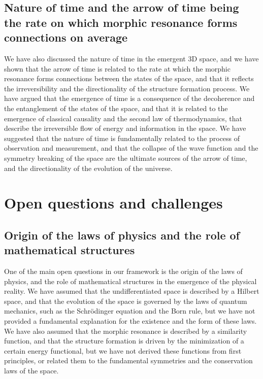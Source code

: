 \subsection{Nature of time and the arrow of time being the rate on which morphic resonance forms connections on average}
We have also discussed the nature of time in the emergent 3D space, and we have shown that the arrow of time is related to the rate at which the morphic resonance forms connections between the states of the space, and that it reflects the irreversibility and the directionality of the structure formation process. We have argued that the emergence of time is a consequence of the decoherence and the entanglement of the states of the space, and that it is related to the emergence of classical causality and the second law of thermodynamics, that describe the irreversible flow of energy and information in the space. We have suggested that the nature of time is fundamentally related to the process of observation and measurement, and that the collapse of the wave function and the symmetry breaking of the space are the ultimate sources of the arrow of time, and the directionality of the evolution of the universe.

\section{Open questions and challenges}
\subsection{Origin of the laws of physics and the role of mathematical structures}
One of the main open questions in our framework is the origin of the laws of physics, and the role of mathematical structures in the emergence of the physical reality. We have assumed that the undifferentiated space is described by a Hilbert space, and that the evolution of the space is governed by the laws of quantum mechanics, such as the Schrödinger equation and the Born rule, but we have not provided a fundamental explanation for the existence and the form of these laws. We have also assumed that the morphic resonance is described by a similarity function, and that the structure formation is driven by the minimization of a certain energy functional, but we have not derived these functions from first principles, or related them to the fundamental symmetries and the conservation laws of the space.

